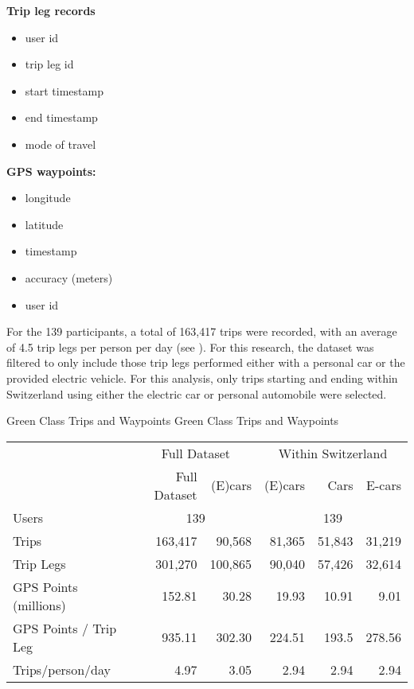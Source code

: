 \begin{multicols}{2}
\textbf{Trip leg records}
\begin{itemize}
  \item user id
  \item trip leg id
  \item start timestamp
  \item end timestamp
  \item mode of travel
\end{itemize}

\textbf{GPS waypoints:} 
\begin{itemize}
  \item longitude
  \item latitude
  \item timestamp
  \item accuracy (meters)
  \item user id
\end{itemize}

\end{multicols}

For the 139 participants, a total of 163,417 trips were recorded, with an average of 4.5 trip legs per person per day (see ).
For this research, the dataset was filtered to only include those trip legs performed either with a personal car or the provided electric vehicle.
For this analysis, only trips starting and ending within Switzerland using either the electric car or personal automobile were selected.


\createtable%
{Green Class Trips and Waypoints}%
{Green Class Trips and Waypoints}%
{\label{tab:green_class_gps_summary}}%
{%
\begin{tabular}{ l | r r | r r r}
                    & \multicolumn{2}{c|}{Full Dataset}  & \multicolumn{3}{c}{Within Switzerland}  \\ 
 
                    & Full Dataset  &   (E)cars & (E)cars   & Cars & E-cars \\ 
\hline
 Users            & \multicolumn{2}{c|}{139} & \multicolumn{3}{c}{139} \\  
 Trips            & 163,417       & 90,568    & 81,365    & 51,843    & 31,219\\  
 Trip Legs        & 301,270     & 100,865   & 90,040    & 57,426    & 32,614\\  
 GPS Points (millions)      &  152.81  &   30.28    &    19.93    & 10.91 & 9.01 \\ 
 GPS Points / Trip Leg &  935.11   &    302.30    &  224.51     &   193.5   &  278.56  \\  
 Trips/person/day & 4.97          & 3.05      & 2.94      & 2.94      & 2.94 \\  
\end{tabular}
}
{}



